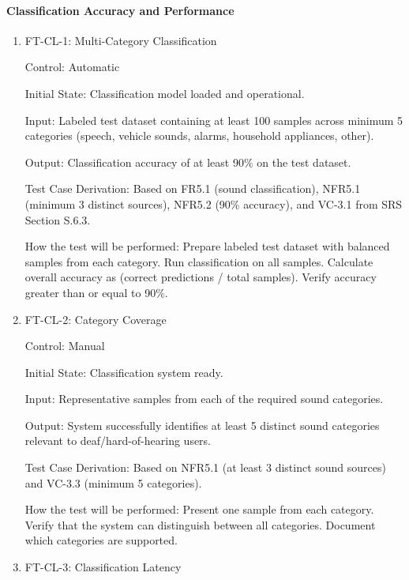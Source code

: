 \documentclass[12pt, titlepage]{article}
\begin{document}
\paragraph{Classification Accuracy and Performance}

\begin{enumerate}

\item{FT-CL-1: Multi-Category Classification\\}

Control: Automatic
					
Initial State: Classification model loaded and operational.
					
Input: Labeled test dataset containing at least 100 samples across minimum 5
categories (speech, vehicle sounds, alarms, household appliances, other).
					
Output: Classification accuracy of at least 90\% on the test dataset.

Test Case Derivation: Based on FR5.1 (sound classification), NFR5.1 (minimum 3
distinct sources), NFR5.2 (90\% accuracy), and VC-3.1 from SRS Section S.6.3.

How the test will be performed: Prepare labeled test dataset with balanced samples
from each category. Run classification on all samples. Calculate overall
accuracy as (correct predictions / total samples). Verify accuracy greater than 
or equal to 90\%.

\item{FT-CL-2: Category Coverage\\}

Control: Manual
					
Initial State: Classification system ready.
					
Input: Representative samples from each of the required sound categories.
					
Output: System successfully identifies at least 5 distinct sound categories
relevant to deaf/hard-of-hearing users.

Test Case Derivation: Based on NFR5.1 (at least 3 distinct sound sources) and
VC-3.3 (minimum 5 categories).

How the test will be performed: Present one sample from each category. Verify that
the system can distinguish between all categories. Document which categories are
supported.

\item{FT-CL-3: Classification Latency\\}


\end{enumerate}
\end{document}
